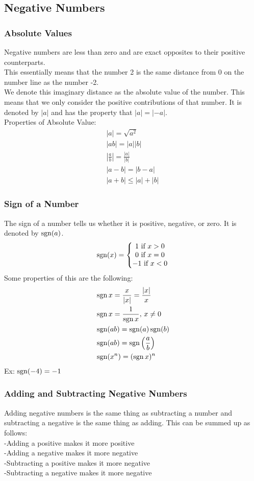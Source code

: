 \documentclass[11pt, fleqn]{article}
\begin{document}
\subsection{Negative Numbers}

\subsubsection{Absolute Values}
Negative numbers are less than zero and are exact opposites to their positive counterparts.\\
This essentially means that the number 2 is the same distance from 0 on the number line as the number -2.\\
We denote this imaginary distance as the absolute value of the number. This means that we only consider the positive contributions of that number. It is denoted by $|a|$ and has the property that $|a|=|-a|$.\\
Properties of Absolute Value:
\begin{align*}
    |a|=\sqrt{a^2}\\
    |ab|=|a||b|\\
    \left|\frac{a}{b}\right|=\frac{|a|}{|b|}\\
    |a-b|=|b-a|\\
    |a+b|\leq|a|+|b|
\end{align*}

\subsubsection{Sign of a Number}
The sign of a number tells us whether it is positive, negative, or zero. It is denoted by $\operatorname{sgn}(a)$.
$$\operatorname{sgn}(x)=\left\{\begin{matrix}
1\text{ if }x>0\\
0\text{ if }x=0\\
-1\text{ if }x<0
\end{matrix}\right.$$
Some properties of this are the following:
\begin{align*}
    &\operatorname{sgn} x=\frac{x}{|x|}=\frac{|x|}{x}\\
    &\operatorname{sgn} x=\frac{1}{\operatorname{sgn} x},\,x\neq 0\\
    &\operatorname{sgn}(ab)=\operatorname{sgn}(a)\operatorname{sgn}(b)\\
    &\operatorname{sgn}(ab)=\operatorname{sgn}\left(\frac{a}{b}\right)\\
    &\operatorname{sgn}(x^n)=(\operatorname{sgn} x)^n
\end{align*}
Ex: $\operatorname{sgn}(-4)=-1$

\subsubsection{Adding and Subtracting Negative Numbers}
Adding negative numbers is the same thing as subtracting a number and subtracting a negative is the same thing as adding. This can be summed up as follows:\\
-Adding a positive makes it more positive\\
-Adding a negative makes it more negative\\
-Subtracting a positive makes it more negative\\
-Subtracting a negative makes it more negative
\end{document}
